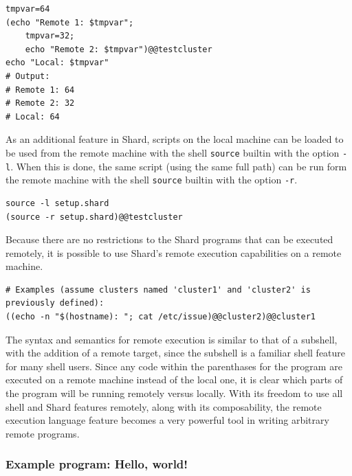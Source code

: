 \documentclass[twoside]{report}
\begin{document}
\begin{minipage}[c]{\textwidth-15pt}
  \begin{lstlisting}[language=Shard]
tmpvar=64
(echo "Remote 1: $tmpvar";
    tmpvar=32;
    echo "Remote 2: $tmpvar")@@testcluster
echo "Local: $tmpvar"
# Output:
# Remote 1: 64
# Remote 2: 32
# Local: 64
\end{lstlisting}
  \smallskip
\end{minipage}

As an additional feature in Shard, scripts on the local machine can be loaded to be used from the remote machine with the shell \texttt{source} builtin with the option \texttt{-l}.
When this is done, the same script (using the same full path) can be run form the remote machine with the shell \texttt{source} builtin with the option \texttt{-r}.

\begin{minipage}[c]{\textwidth-15pt}
  \begin{lstlisting}[language=Shard]
source -l setup.shard
(source -r setup.shard)@@testcluster
\end{lstlisting}
  \smallskip
\end{minipage}

Because there are no restrictions to the Shard programs that can be executed remotely, it is possible to use Shard's remote execution capabilities on a remote machine.

\begin{minipage}[c]{\textwidth-15pt}
  \begin{lstlisting}[language=Shard]
# Examples (assume clusters named 'cluster1' and 'cluster2' is previously defined):
((echo -n "$(hostname): "; cat /etc/issue)@@cluster2)@@cluster1
\end{lstlisting}
  \smallskip
\end{minipage}

The syntax and semantics for remote execution is similar to that of a subshell, with the addition of a remote target, since the subshell is a familiar shell feature for many shell users.
Since any code within the parenthases for the program are executed on a remote machine instead of the local one, it is clear which parts of the program will be running remotely versus locally.
With its freedom to use all shell and Shard features remotely, along with its composability, the remote execution language feature becomes a very powerful tool in writing arbitrary remote programs.

\subsubsection{Example program: Hello, world!}
\end{document}
